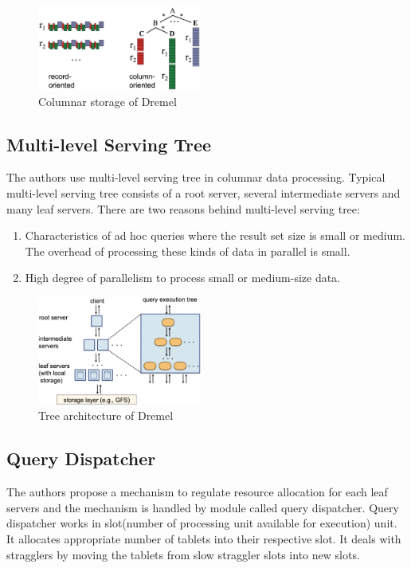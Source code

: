 \documentclass[twocolumn]{article}
\newcommand{\be}{\begin{enumerate}}
\newcommand{\ee}{\end{enumerate}}
\newcommand{\ii}{\item}
\begin{document}
\begin{figure}[htb]
        \centering
        \includegraphics[width=0.48\textwidth]{column-oriented.png}
        \caption{Columnar storage of Dremel}
        \label{fig:column-oriented}
\end{figure}

\subsection{Multi-level Serving Tree}
The authors use multi-level serving tree in columnar data processing. Typical multi-level serving tree consists of a root server, several intermediate servers and many leaf servers. There are two reasons behind multi-level serving tree:
\be
\ii Characteristics of ad hoc queries where the result set size is small or medium. The overhead of processing these kinds of data in parallel is small.
\ii High degree of parallelism to process small or medium-size data.
\ee
\begin{figure}[htb]
        \centering
        \includegraphics[width=0.48\textwidth]{query-execution-tree.png}
        \caption{Tree architecture of Dremel}
        \label{fig:tree}
\end{figure}

\subsection{Query Dispatcher}
The authors propose a mechanism to regulate resource allocation for each leaf servers and the mechanism is handled by module called query dispatcher. Query dispatcher works in slot(number of processing unit available for execution) unit. It allocates appropriate number of tablets into their respective slot. It deals with stragglers by moving the tablets from slow straggler slots into new slots.
\end{document}
